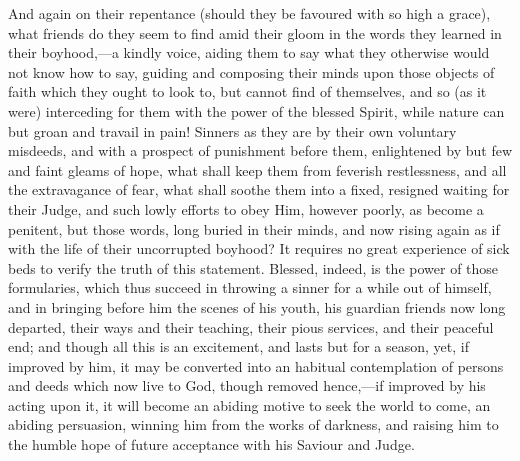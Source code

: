And again on their repentance (should they be favoured
with so high a grace), what friends do they seem to find
amid their gloom in the words they learned in their
boyhood,—a kindly voice, aiding them to say what
they otherwise would not know how to say, guiding and
composing their minds upon those objects of faith which
they ought to look to, but cannot find of themselves, and
so (as it were) interceding for them with the power of
the blessed Spirit, while nature can but groan and
travail in pain! Sinners as they are by their own
voluntary misdeeds, and with a prospect of punishment
before them, enlightened by but few and faint gleams of
hope, what shall keep them from feverish restlessness,
and all the extravagance of fear, what shall soothe them
into a fixed, resigned waiting for their Judge, and such
lowly efforts to obey Him, however poorly, as become a
penitent, but those words, long buried in their minds,
and now rising again as if with the life of their
uncorrupted boyhood? It requires no great experience of
sick beds to verify the truth of this statement. Blessed,
indeed, is the power of those formularies, which thus
succeed in throwing a sinner for a while out of himself,
and in bringing before him the scenes of his youth, his
guardian friends now long departed, their ways and their
teaching, their pious services, and their peaceful end;
and though all this is an excitement, and lasts but for a
season, yet, if improved by him, it may be converted into
an habitual contemplation of persons and deeds which now
live to God, though removed hence,—if improved by
his acting upon it, it will become an abiding motive to
seek the world to come, an abiding persuasion, winning
him from the works of darkness, and raising him to the
humble hope of future acceptance with his Saviour and
Judge.

